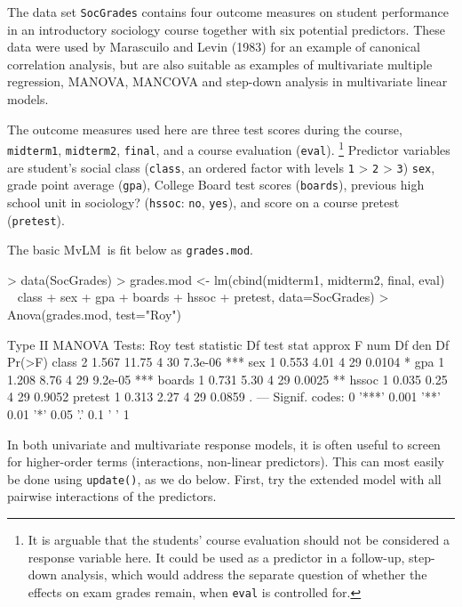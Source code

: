 \documentclass[11pt]{article}
\newcommand*{\MLM}{MvLM\xspace}
\newcommand{\code}[1]{{\texttt{#1}}}
\newcommand{\func}[1]{{\texttt{#1()}}}
\begin{document}
The data set \code{SocGrades} contains four outcome measures on student performance
in an introductory sociology course together with six potential predictors.
These data were used by Marascuilo and Levin (1983) for an example of
canonical correlation analysis, but are also suitable as examples of
multivariate multiple regression, MANOVA, MANCOVA
and step-down analysis in multivariate linear models.

The outcome measures used here are three test scores during the course,
\code{midterm1}, \code{midterm2}, \code{final},
and a course evaluation (\code{eval}).%
\footnote{It is arguable that the students' course evaluation should not
	be considered a response variable here.  It could be used as a
	predictor in a follow-up, 	step-down analysis, which would address the separate
	question of
	whether the effects on exam grades remain, when \code{eval} is 
	controlled for.  
}
Predictor variables are student's social class (\code{class}, an ordered factor with levels \code{1} > \code{2} > \code{3})
  \code{sex},
  grade point average (\code{gpa}),
  College Board test scores (\code{boards}),
  previous high school unit in sociology?  (\code{hssoc}: \code{no}, \code{yes}), and
  score on a course pretest (\code{pretest}).

The basic \MLM\ is fit below as \code{grades.mod}.
\begin{Schunk}
\begin{Sinput}
> data(SocGrades)
> grades.mod <- lm(cbind(midterm1, midterm2, final, eval) ~ 
  	class + sex + gpa + boards + hssoc + pretest, data=SocGrades)
> Anova(grades.mod, test="Roy")
\end{Sinput}
\begin{Soutput}
Type II MANOVA Tests: Roy test statistic
        Df test stat approx F num Df den Df  Pr(>F)    
class    2     1.567    11.75      4     30 7.3e-06 ***
sex      1     0.553     4.01      4     29  0.0104 *  
gpa      1     1.208     8.76      4     29 9.2e-05 ***
boards   1     0.731     5.30      4     29  0.0025 ** 
hssoc    1     0.035     0.25      4     29  0.9052    
pretest  1     0.313     2.27      4     29  0.0859 .  
---
Signif. codes:  0 '***' 0.001 '**' 0.01 '*' 0.05 '.' 0.1 ' ' 1 
\end{Soutput}
\end{Schunk}

In both univariate and multivariate
response models, it is often useful to screen for higher-order
terms (interactions, non-linear predictors).  This can most easily be
done using \func{update}, as we do below.  First, try the extended
model with all pairwise interactions of the predictors.
\end{document}
